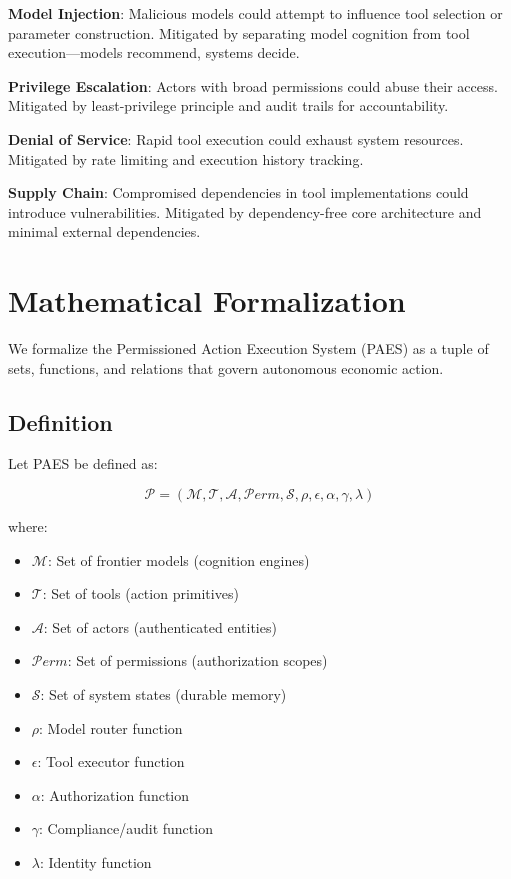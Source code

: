 \documentclass[11pt,a4paper]{article}
\begin{document}
\textbf{Model Injection}: Malicious models could attempt to influence tool selection or parameter construction. Mitigated by separating model cognition from tool execution—models recommend, systems decide.

\textbf{Privilege Escalation}: Actors with broad permissions could abuse their access. Mitigated by least-privilege principle and audit trails for accountability.

\textbf{Denial of Service}: Rapid tool execution could exhaust system resources. Mitigated by rate limiting and execution history tracking.

\textbf{Supply Chain}: Compromised dependencies in tool implementations could introduce vulnerabilities. Mitigated by dependency-free core architecture and minimal external dependencies.

\section{Mathematical Formalization}

We formalize the Permissioned Action Execution System (PAES) as a tuple of sets, functions, and relations that govern autonomous economic action.

\subsection{Definition}

Let PAES be defined as:

\[
\mathcal{P} = (\mathcal{M}, \mathcal{T}, \mathcal{A}, \mathcal{P}erm, \mathcal{S}, \rho, \epsilon, \alpha, \gamma, \lambda)
\]

where:

\begin{itemize}
    \item $\mathcal{M}$: Set of frontier models (cognition engines)
    \item $\mathcal{T}$: Set of tools (action primitives)
    \item $\mathcal{A}$: Set of actors (authenticated entities)
    \item $\mathcal{P}erm$: Set of permissions (authorization scopes)
    \item $\mathcal{S}$: Set of system states (durable memory)
    \item $\rho$: Model router function
    \item $\epsilon$: Tool executor function
    \item $\alpha$: Authorization function
    \item $\gamma$: Compliance/audit function
    \item $\lambda$: Identity function
\end{itemize}
\end{document}

